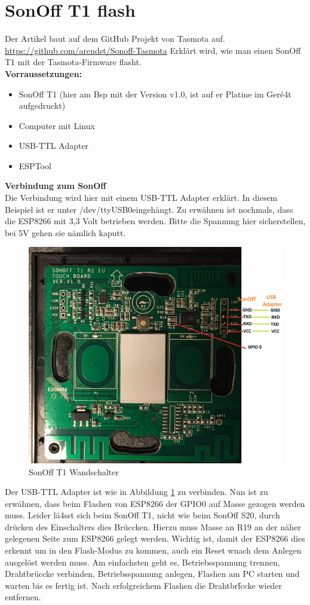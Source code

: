 \documentclass[11pt,fleqn]{book} %
\numberwithin{equation}{section} %
\numberwithin{figure}{section} %
\numberwithin{table}{section} %
\begin{document}
 \section{SonOff T1 flash}
Der Artikel baut auf dem GitHub Projekt von Tasmota auf. \url{https://github.com/arendst/Sonoff-Tasmota} Erklärt wird, wie man einen SonOff T1 mit der Tasmota-Firmware flasht.\\
\textbf{Vorraussetzungen:}
\begin{itemize}
\item SonOff T1 (hier am Bsp mit der Version v1.0, ist auf er Platine im Ger\'e4t aufgedruckt)
\item Computer mit Linux
\item USB-TTL Adapter
\item ESPTool
\end{itemize}
\textbf{Verbindung zum SonOff}\\
Die Verbindung wird hier mit einem USB-TTL Adapter erklärt. In diesem Beispiel ist er unter \glqq /dev/ttyUSB0\grqq eingehängt. Zu erwähnen ist nochmals, dass die ESP8266 mit 3,3 Volt betrieben werden. Bitte die Spannung hier sicherstellen, bei 5V gehen sie nämlich kaputt.
\begin{figure}[!h]%
\centering
\includegraphics[scale=0.23]{Pictures/sonoff_t1.jpg}
\caption{SonOff T1 Wandschalter\label{pic:sonoff-t1-connect} }
\end{figure}
Der USB-TTL Adapter ist wie in Abbildung \ref{pic:sonoff-t1-connect} zu verbinden. Nun ist zu erwähnen, dass beim Flashen von ESP8266 der GPIO0 auf Masse gezogen werden muss. Leider lä4sst sich beim SonOff T1, nicht wie beim SonOff S20, durch drücken des Einschalters dies Brüccken. Hierzu muss Masse an R19 an der näher gelegenen Seite zum ESP8266 gelegt werden. Wichtig ist, damit der ESP8266 dies erkennt um in den Flash-Modus zu kommen, auch ein Reset wnach dem Anlegen ausgelöst werden muss. Am einfachsten geht es, Betriebsspannung trennen, Drahtbrüccke verbinden, Betriebsspannung anlegen, Flashen am PC starten und warten bis es fertig ist. Nach erfolgreichem Flashen die Drahtbr\'fccke wieder entfernen.\\
\end{document}
